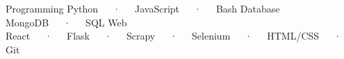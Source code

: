 

\begin{cvtechnicals}
  \cvtechnical %
    {Programming} %
    {Python~~~·~~~JavaScript~~~·~~~Bash} %
    {Database} %
    {MongoDB~~~·~~~SQL} %
    {Web} %
    {React~~~·~~~Flask~~~·~~~Scrapy~~~·~~~Selenium~~~·~~~HTML/CSS~~~·~~~Git} %
\end{cvtechnicals}